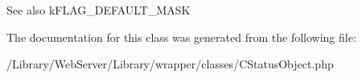 \begin{DoxySeeAlso}{See also}
k\-F\-L\-A\-G\-\_\-\-D\-E\-F\-A\-U\-L\-T\-\_\-\-M\-A\-S\-K 
\end{DoxySeeAlso}


The documentation for this class was generated from the following file\-:\begin{DoxyCompactItemize}
\item 
/\-Library/\-Web\-Server/\-Library/wrapper/classes/C\-Status\-Object.\-php\end{DoxyCompactItemize}
